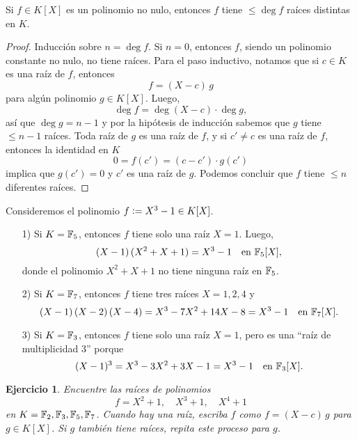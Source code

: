 \documentclass{article}
\theoremstyle{plain}
\newtheorem{ejerc}{Ejercicio}
\begin{document}
\begin{corolario}[Lagrange, 1768]
  \label{cor:Lagrange}
  Si $f\in K [X]$ es un polinomio no nulo, entonces $f$ tiene $\le \deg f$
  raíces distintas en $K$.

  \begin{proof}
    Inducción sobre $n = \deg f$. Si $n = 0$, entonces $f$, siendo un polinomio
    constante no nulo, no tiene raíces. Para el paso inductivo, notamos que si
    $c\in K$ es una raíz de $f$, entonces
    $$f = (X-c)\,g$$
    para algún polinomio $g\in K [X]$. Luego,
    $$\deg f = \deg (X-c)\cdot \deg g,$$
    así que $\deg g = n - 1$ y por la hipótesis de inducción sabemos que $g$
    tiene $\le n - 1$ raíces. Toda raíz de $g$ es una raíz de $f$, y si
    $c' \ne c$ es una raíz de $f$, entonces la identidad en $K$
    $$0 = f (c') = (c-c')\cdot g (c')$$
    implica que $g (c') = 0$ y $c'$ es una raíz de $g$. Podemos concluir que $f$
    tiene $\le n$ diferentes raíces.
  \end{proof}
\end{corolario}

\begin{ejemplo}
  Consideremos el polinomio $f \mathrel{\mathop:}= X^3 - 1 \in K [X]$.

  \begin{enumerate}
  \item[1)] Si $K = \mathbb{F}_5$, entonces $f$ tiene solo una raíz $X = 1$. Luego,
    $$(X - 1)\,(X^2 + X + 1) = X^3 - 1 \quad\text{en }\mathbb{F}_5 [X],$$
    donde el polinomio $X^2 + X + 1$ no tiene ninguna raíz en $\mathbb{F}_5$.

  \item[2)] Si $K = \mathbb{F}_7$, entonces $f$ tiene tres raíces $X = 1, 2, 4$ y
    $$(X - 1)\,(X - 2)\,(X - 4) = X^3 - 7X^2 + 14X - 8 = X^3 - 1 \quad\text{en }\mathbb{F}_7 [X].$$

  \item[3)] Si $K = \mathbb{F}_3$, entonces $f$ tiene solo una raíz $X = 1$, pero es
    una ``raíz de multiplicidad $3$'' porque
    \[ (X-1)^3 = X^3 - 3X^2 + 3X - 1 = X^3 - 1
      \quad \text{en }\mathbb{F}_3 [X]. \qedhere \]
  \end{enumerate}
\end{ejemplo}
\begin{ejerc}
  Encuentre las raíces de polinomios
  $$f = X^2 + 1, \quad X^3 + 1, \quad X^4 + 1$$
  en $K = \mathbb{F}_2, \mathbb{F}_3, \mathbb{F}_5, \mathbb{F}_7$. Cuando hay una raíz, escriba $f$ como
  $f = (X-c)\,g$ para $g \in K [X]$. Si $g$ también tiene raíces, repita este
  proceso para $g$.
\end{ejerc}
\end{document}
